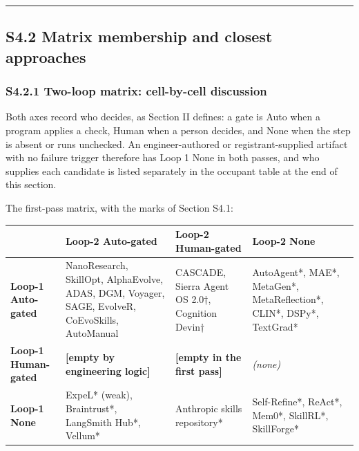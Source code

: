 \documentclass[
]{article}
\newcounter{none} %
\begin{document}
\begin{center}\rule{0.5\linewidth}{0.5pt}\end{center}

\subsection{S4.2 Matrix membership and closest
approaches}\label{s4.2-matrix-membership-and-closest-approaches}

\subsubsection{S4.2.1 Two-loop matrix: cell-by-cell
discussion}\label{s4.2.1-two-loop-matrix-cell-by-cell-discussion}

Both axes record who decides, as Section II defines: a gate is Auto when
a program applies a check, Human when a person decides, and None when
the step is absent or runs unchecked. An engineer-authored or
registrant-supplied artifact with no failure trigger therefore has Loop
1 None in both passes, and who supplies each candidate is listed
separately in the occupant table at the end of this section.

The first-pass matrix, with the marks of Section S4.1:

{\def\LTcaptype{none} %
\begin{longtable}[]{@{}
  >{\raggedright\arraybackslash}p{}
  >{\raggedright\arraybackslash}p{}
  >{\raggedright\arraybackslash}p{}
  >{\raggedright\arraybackslash}p{}@{}}
\toprule\noalign{}
\begin{minipage}[b]{\linewidth}\raggedright
\end{minipage} & \begin{minipage}[b]{\linewidth}\raggedright
\textbf{Loop-2 Auto-gated}
\end{minipage} & \begin{minipage}[b]{\linewidth}\raggedright
\textbf{Loop-2 Human-gated}
\end{minipage} & \begin{minipage}[b]{\linewidth}\raggedright
\textbf{Loop-2 None}
\end{minipage} \\
\midrule\noalign{}
\endhead
\bottomrule\noalign{}
\endlastfoot
\textbf{Loop-1 Auto-gated} & NanoResearch, SkillOpt, AlphaEvolve, ADAS,
DGM, Voyager, SAGE, EvolveR, CoEvoSkills, AutoManual & CASCADE, Sierra
Agent OS 2.0†, Cognition Devin† & AutoAgent*, MAE*, MetaGen*,
MetaReflection*, CLIN*, DSPy*, TextGrad* \\
\textbf{Loop-1 Human-gated} & \textbf{{[}empty by engineering logic{]}}
& \textbf{{[}empty in the first pass{]}} & \emph{(none)} \\
\textbf{Loop-1 None} & ExpeL* (weak), Braintrust*, LangSmith Hub*,
Vellum* & Anthropic skills repository* & Self-Refine*, ReAct*, Mem0*,
SkillRL*, SkillForge* \\
\end{longtable}
}
\end{document}
